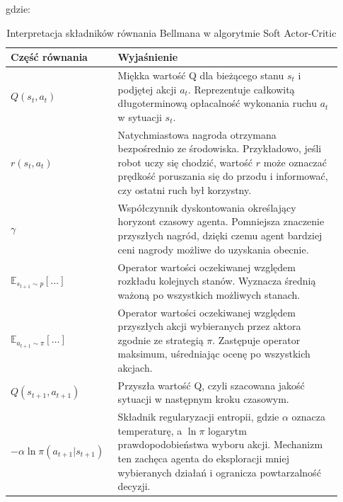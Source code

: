\documentclass[12pt,twoside]{article}
\begin{document}
gdzie:

\begin{table}[H]
\centering

\renewcommand{\arraystretch}{1.3}

\begin{tabular}{|p{0.28\linewidth}|p{0.65\linewidth}|}
\hline

\textbf{Część równania} &
\textbf{Wyjaśnienie}
\\ \hline

$Q(s_t, a_t)$
&
Miękka wartość Q dla bieżącego stanu $s_t$
i podjętej akcji $a_t$.
Reprezentuje całkowitą długoterminową
opłacalność wykonania ruchu $a_t$
w sytuacji $s_t$.
\\ \hline

$r(s_t, a_t)$
&
Natychmiastowa nagroda otrzymana
bezpośrednio ze środowiska.
Przykładowo, jeśli robot uczy się chodzić,
wartość $r$ może oznaczać prędkość
poruszania się do przodu i informować,
czy ostatni ruch był korzystny.
\\ \hline

$\gamma$
&
Współczynnik dyskontowania określający
horyzont czasowy agenta.
Pomniejsza znaczenie przyszłych nagród,
dzięki czemu agent bardziej ceni
nagrody możliwe do uzyskania obecnie.
\\ \hline

$\mathbb{E}_{s_{t+1} \sim p} [ \dots ]$
&
Operator wartości oczekiwanej względem
rozkładu kolejnych stanów.
Wyznacza średnią ważoną
po wszystkich możliwych stanach.
\\ \hline

$\mathbb{E}_{a_{t+1} \sim \pi} [ \dots ]$
&
Operator wartości oczekiwanej względem
przyszłych akcji wybieranych przez aktora
zgodnie ze strategią $\pi$.
Zastępuje operator maksimum,
uśredniając ocenę po wszystkich akcjach.
\\ \hline

$Q(s_{t+1}, a_{t+1})$
&
Przyszła wartość Q,
czyli szacowana jakość sytuacji
w następnym kroku czasowym.
\\ \hline

$-\alpha \ln \pi(a_{t+1}|s_{t+1})$
&
Składnik regularyzacji entropii,
gdzie $\alpha$ oznacza temperaturę,
a $\ln \pi$ logarytm prawdopodobieństwa
wyboru akcji.
Mechanizm ten zachęca agenta
do eksploracji mniej wybieranych działań
i ogranicza powtarzalność decyzji.
\\ \hline

\end{tabular}

\caption{Interpretacja składników równania Bellmana w algorytmie Soft Actor-Critic}
\label{tab:rown_bellman}

\end{table}
\end{document}
